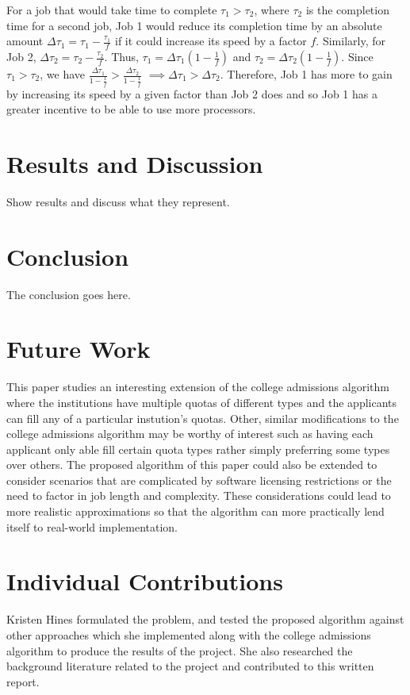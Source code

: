 \documentclass[conference]{IEEEtran}
\begin{document}
For a job that would take time to complete 
\(\tau_1 > \tau_2\), where \(\tau_2\) is the
completion time for a second job,
Job 1 would reduce its completion time by an 
absolute amount 
\(\Delta \tau_1 = \tau_1-\frac{\tau_1}{f}\) 
if it could increase its speed by a factor \(f\).
Similarly, for Job 2, 
\(\Delta \tau_2 = \tau_2-\frac{\tau_2}{f}\).
Thus, 
\(\tau_1=\Delta \tau_1(1-\frac{1}{f})\)
and
\(\tau_2=\Delta \tau_2(1-\frac{1}{f})\).
Since 
\(\tau_1 > \tau_2\), we have
\(\frac{\Delta\tau_1}{1-\frac{1}{f}} > \frac{\Delta\tau_2}{1-\frac{1}{f}}\) 
\(\implies \Delta \tau_1 > \Delta \tau_2\).
Therefore, Job 1 has more to gain by increasing its speed by 
a given factor than Job 2 does and so Job 1 has a greater incentive
to be able to use more processors.




\section{Results and Discussion}
Show results and discuss what they represent.

\section{Conclusion}
The conclusion goes here.

\section{Future Work}
This paper studies an interesting extension of the college admissions
algorithm where the institutions have multiple quotas of different types
and the applicants can fill any of a particular instution's quotas.
Other, similar modifications to the college admissions algorithm 
may be worthy of interest such as having each applicant only able fill certain 
quota types rather 
simply preferring some types over others.
The proposed algorithm of this paper could also be extended to consider 
scenarios that are complicated by software licensing restrictions
or the need to factor in job length and complexity.
These considerations could lead to more realistic approximations 
so that the algorithm can more practically lend itself to 
real-world implementation.

\section{Individual Contributions}
Kristen Hines formulated the problem, 
and tested the proposed algorithm against other 
approaches which she implemented along with the 
college admissions algorithm to produce the 
results of the project.
She also researched the background literature related to the 
project and contributed to this written report.
\end{document}
